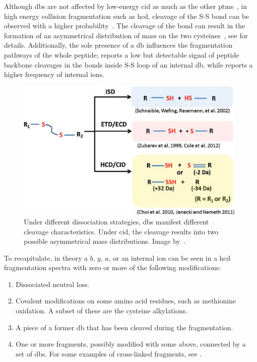 Although \glspl*{db} are not affected by low-energy \gls*{cid} as much as the other \glspl*{ptm}~\cite{paizs2005fragmentation, lioe2007novel}, in high energy collision fragmentation such as \gls*{hcd}, cleavage of the S-S bond can be observed with a higher probability~\cite{bean1992characterization}. The cleavage of the bond can result in the formation of an asymmetrical distribution of mass on the two cysteines~\cite{zhang2006mapping}, see  for details. Additionally, the sole presence of a \gls*{db} influences the fragmentation pathways of the whole peptide; \citet{mormann2008fragmentation} reports a low but detectable signal of peptide backbone cleavages in the bonds inside S-S loop of an internal \gls*{db}, while \citet{clark2011collision} reports a higher frequency of internal ions.

\begin{figure}
  \centering
  \includegraphics[width=.6\linewidth]{img/disulfide-bond-cleavage-assymetry.jpg}
  \caption{Under different dissociation strategies, \glspl*{db} manifest different cleavage characteristics. Under \gls*{cid}, the cleavage results into two possible asymmetrical mass distributions. Image by~\citet{tsai2013mass}.}\label{fig:disulphide-bond-cleavage-assymetry}
\end{figure}

To recapitulate, in theory a \(b\), \(y\), \(a\), or an internal ion can be seen in a \gls*{hcd} fragmentation spectra with zero or more of the following modifications:

\begin{enumerate}
  \item Dissociated neutral loss.
  \item Covalent modifications on some amino acid residues, such as methionine oxidation. A subset of these are the cysteine alkylations.
  \item A piece of a former \gls*{db} that has been cleaved during the fragmentation.
  \item One or more fragments, possibly modified with some above, connected by a set of \glspl*{db}. For some examples of cross-linked fragments, see .
\end{enumerate}

